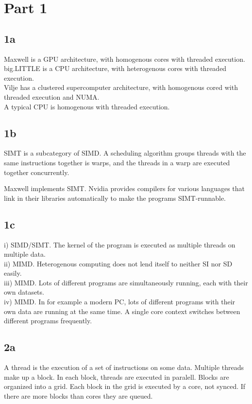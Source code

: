 \section*{Part 1}
\subsection*{1a}
Maxwell is a GPU architecture, with homogenous cores with threaded execution.
\\
big.LITTLE is a CPU architecture, with heterogenous cores with threaded execution.
\\
Vilje has a clustered supercomputer architecture, with homogenous cored with threaded execution and NUMA.
\\
A typical CPU is homogenous with threaded execution.

\subsection*{1b}
SIMT is a subcategory of SIMD.
A scheduling algorithm groups threads with the same instructions together is warps,
and the threads in a warp are executed together concurrently.

Maxwell implements SIMT. Nvidia provides compilers for various languages that link in their libraries automatically to make the programs SIMT-runnable.

\subsection*{1c}
i) SIMD/SIMT. The kernel of the program is executed as multiple threads on multiple data.\\
ii) MIMD. Heterogenous computing does not lend itself to neither SI nor SD easily.\\
iii) MIMD. Lots of different programs are simultaneously running, each with their own datasets.\\
iv) MIMD. In for example a modern PC, lots of different programs with their own data are running at the same time. A single core context switches between different programs frequently.

\subsection*{2a}
A thread is the execution of a set of instructions on some data.
Multiple threads make up a block.
In each block, threads are executed in paralell.
Blocks are organized into a grid.
Each block in the grid is executed by a core, not synced.
If there are more blocks than cores they are queued.

